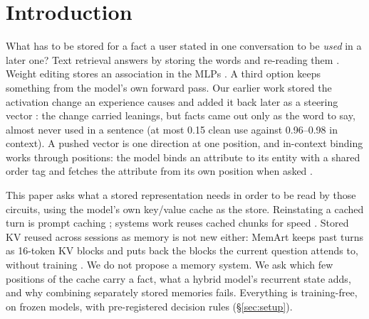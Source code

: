 \documentclass[11pt]{article}
\begin{document}
\section{Introduction}
\label{sec:intro}

What has to be stored for a fact a user stated in one conversation to be \emph{used} in a later one? Text retrieval
answers by storing the words and re-reading them \citep{lewis2020rag,packer2023memgpt}. Weight editing stores an
association in the MLPs \citep{meng2022rome,meng2023memit}. A third option keeps something from the model's own
forward pass. Our earlier work stored the activation change an experience causes and added it back later as a
steering vector \citep{jumle2026steering}: the change carried leanings, but facts came out only as the word to say,
almost never used in a sentence (at most 0.15 clean use against 0.96--0.98 in context). A pushed vector is one
direction at one position, and in-context binding works through positions: the model binds an attribute to its entity
with a shared order tag and fetches the attribute from its own position when asked
\citep{feng2024binding,prakash2024entity,prakash2026lookbacks,dai2024binding}.

This paper asks what a stored representation needs in order to be read by those circuits, using the model's own key/value
cache as the store. Reinstating a cached turn is prompt caching \citep{gim2024promptcache}; systems work reuses
cached chunks for speed \citep{yao2025cacheblend,hu2025epic,xiao2024infllm}. Stored KV reused across sessions as
memory is not new either: MemArt keeps past turns as 16-token KV blocks and puts back the blocks the current question
attends to, without training \citep{zeng2026memart}. We do not propose a memory system. We ask which few positions of
the cache carry a fact, what a hybrid model's recurrent state adds, and why combining separately stored memories
fails. Everything is training-free, on frozen models, with pre-registered decision rules (\S\ref{sec:setup}).
\end{document}
